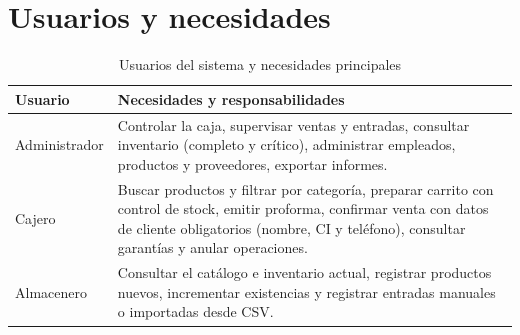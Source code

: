 \section{Usuarios y necesidades}
\begin{table}[H]\centering\caption{Usuarios del sistema y necesidades principales}\begin{tabular}{p{}p{}}\toprule
Usuario & Necesidades y responsabilidades\\\midrule
Administrador & Controlar la caja, supervisar ventas y entradas, consultar inventario (completo y crítico), administrar empleados, productos y proveedores, exportar informes.\\
Cajero & Buscar productos y filtrar por categoría, preparar carrito con control de stock, emitir proforma, confirmar venta con datos de cliente obligatorios (nombre, CI y teléfono), consultar garantías y anular operaciones.\\
Almacenero & Consultar el catálogo e inventario actual, registrar productos nuevos, incrementar existencias y registrar entradas manuales o importadas desde CSV.\\\bottomrule
\end{tabular}\end{table}

